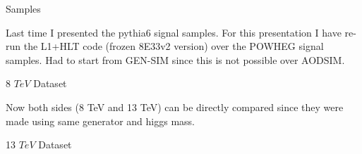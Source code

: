 \documentclass[8pt]{beamer}
\begin{document}
\begin{frame}{Samples}

Last time I presented the pythia6 signal samples. For this presentation I have re-run the L1+HLT code (frozen 8E33v2 version) over the POWHEG signal samples. Had to start from GEN-SIM since this is not
possible over AODSIM.

\begin{block}{8 $TeV$ Dataset}


\end{block}

Now both sides (8 TeV and 13 TeV) can be directly compared since they were made using same generator and higgs mass.

\begin{block}{13 $TeV$ Dataset}


\end{block}
 
\end{frame}
\end{document}
